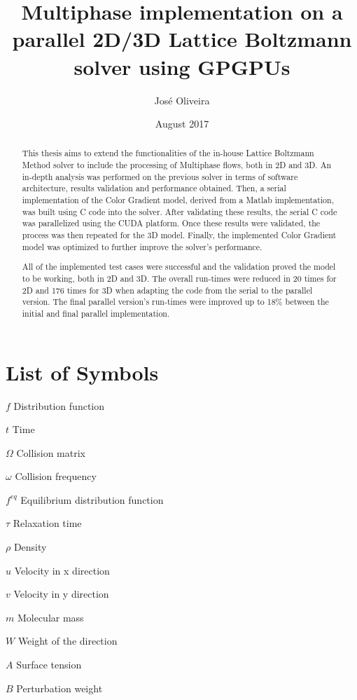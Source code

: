\documentclass[12pt, openany]{book}
\title{Multiphase implementation on a parallel 2D/3D Lattice Boltzmann solver
	using GPGPUs}
\author{José Oliveira}
\date{August 2017}
\begin{document}
\frontmatter

\maketitle

\begin{abstract}
  This thesis aims to extend the functionalities of the in-house Lattice Boltzmann Method solver to include the processing of Multiphase flows, both in 2D and 3D. An in-depth analysis was performed on the previous solver in terms of software architecture, results validation and performance obtained. Then, a serial implementation of the Color Gradient model, derived from a Matlab implementation, was built using C code into the solver. After validating these results, the serial C code was parallelized using the CUDA platform. Once these results were validated, the process was then repeated for the 3D model. Finally, the implemented Color Gradient model was optimized to further improve the solver's performance. \par
  All of the implemented test cases were successful and the validation proved the model to be working, both in 2D and 3D. The overall run-times were reduced in 20 times for 2D and 176 times for 3D when adapting the code from the serial to the parallel version. The final parallel version's run-times were improved up to 18\% between the initial and final parallel implementation.  
\end{abstract}

\sstableofcontents

\sslistoffigures

\sslistoftables

\chapter{List of Symbols}

\begin{abbrv}
	\item[$f$]                   Distribution function
	\item[$t$]                   Time
	\item[$\Omega$]              Collision matrix
	\item[$\omega$]              Collision frequency
	\item[$f^{eq}$]              Equilibrium distribution function
	\item[$\tau$]				 Relaxation time
	\item[$\rho$]				 Density
	\item[$u$]				 Velocity in x direction
	\item[$v$]				 Velocity in y direction
	\item[$m$]				 Molecular mass
	\item[$W$]				 Weight of the direction
	\item[$A$]				 Surface tension
	\item[$B$]				 Perturbation weight
\end{abbrv}
\end{document}
